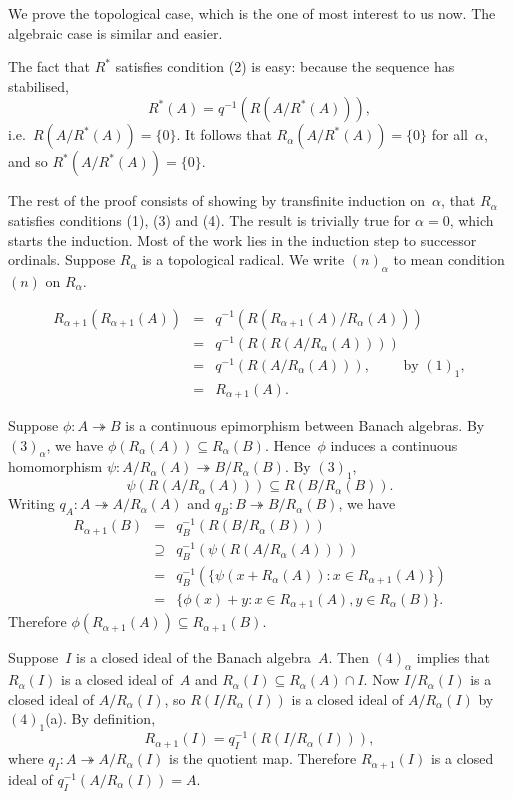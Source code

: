 \documentclass[11pt]{article}
\newcounter{arbenum}
\newenvironment{arbenumerate}{\begin{list}{{\rm(\arabic{arbenum})}}%
{\usecounter{arbenum}}}{\end{list}}
\newcommand{\ie}{i.e.\ }
\newcommand{\sseq}{\subseteq}
\let\leq\undefined  \let\geq\undefined
\let\le\leq   \let\ge\geq
\newcommand{\al}{\alpha}
\newcommand{\onto}{\twoheadrightarrow}
\newenvironment{Proof}{{\it Proof. }}{}%
\newcommand{\detail}[1]{}
\newcommand{\Rstar}{R^*}
\begin{document}
\begin{Proof}
We prove the topological case, which is the one of most interest to us now.
The algebraic case is similar and easier.

The fact that $\Rstar$ satisfies condition (2) is easy: because the sequence
has stabilised,
$$\Rstar(A) = q^{-1}(R(A/\Rstar(A))),$$
\ie $R(A/\Rstar(A)) = \{0\}$.   It follows that $R_\al(A/\Rstar(A)) = \{0\}$
for all~$\al$, and so $\Rstar(A/\Rstar(A)) = \{0\}$.

The rest of the proof consists of showing by transfinite induction on~$\al$,
that $R_\al$ satisfies conditions (1), (3) and (4).    The result is trivially
true for $\al = 0$, which starts the induction.   Most of the work lies in the
induction step to successor ordinals.  Suppose $R_\al$ is a topological radical.   We
write $(n)_\al$ to mean condition $(n)$ on $R_\al$.
\begin{arbenumerate}
\item
\begin{eqnarray*}
R_{\al+1}(R_{\al+1}(A)) & = & q^{-1}(R(R_{\al+1}(A)/R_\al(A)))\\
& = & q^{-1}(R(R(A/R_\al(A)))) \\
& = & q^{-1}(R(A/R_\al(A))), \qquad\mbox{ by }(1)_1, \\
& = & R_{\al+1}(A).
\end{eqnarray*}
\addtocounter{arbenum}{1}
\item
Suppose $\phi:A \onto B$ is a continuous epimorphism between
Banach algebras.    By $(3)_\al$, we have $\phi(R_\al(A))
\sseq R_\al(B)$.  Hence~$\phi$ induces a continuous homomorphism
$\psi:A/R_\al(A) \onto B/R_\al(B)$\detail{ by $\psi(a + R_\al(A)) = \phi(a) + R_\al(B)$
with $\|\psi\| \le \|\phi\|$}.  By $(3)_1$,
$$\psi(R(A/R_\al(A))) \sseq R(B/R_\al(B)).$$
Writing $q_A:A \onto A/R_\al(A)$ and $q_B:B \onto B/R_\al(B)$, we have
\begin{eqnarray*}
R_{\al+1}(B) & = & q_B^{-1}(R(B/R_\al(B)))\\
& \supseteq & q_B^{-1}(\psi(R(A/R_\al(A))))\\
& = & q_B^{-1}(\{\psi(x + R_\al(A)): x \in R_{\al+1}(A)\})\\
& = & \{\phi(x) + y: x \in R_{\al+1}(A), y \in R_\al(B)\}.
\end{eqnarray*}
Therefore $\phi(R_{\al+1}(A)) \sseq R_{\al+1}(B)$.
\item
Suppose~$I$ is a closed ideal of the Banach algebra~$A$.  Then $(4)_\al$ implies
that $R_\al(I)$ is a closed ideal of~$A$ and $R_\al(I) \sseq R_\al(A) \cap I$.
Now $I/R_\al(I)$ is a closed ideal of $A/R_\al(I)$, so
$R(I/R_\al(I))$ is a closed ideal of $A/R_\al(I)$ by $(4)_1$(a).   By definition,
$$R_{\al+1}(I) = q_I^{-1}\left(R(I/R_\al(I))\right),$$
where $q_I:A \onto A/R_\al(I)$ is the quotient map.   Therefore
$R_{\al+1}(I)$ is a closed ideal of $q_I^{-1}\left(A/R_\al(I)\right) = A$.


\end{arbenumerate}
\end{Proof}
\end{document}
